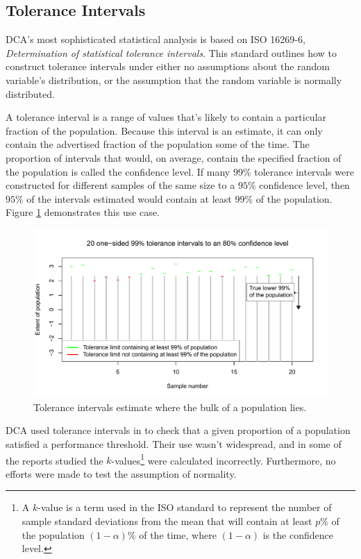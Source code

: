 \documentclass[11pt,a4paper,article]{memoir} %
\begin{document}
\subsection*{Tolerance Intervals}
DCA's most sophisticated statistical analysis is based on ISO 16269-6, \emph{Determination of statistical tolerance intervals}. This standard outlines how to construct tolerance intervals under either no assumptions about the random variable's distribution, or the assumption that the random variable is normally distributed.
\par
 A tolerance interval is a range of values that's likely to contain a particular fraction of the population. Because this interval is an estimate, it can only contain the advertised fraction of the population some of the time. The proportion of intervals that would, on average, contain the specified fraction of the population is called the confidence level. If many $99\%$ tolerance intervals were constructed for different samples of the same size to a $95\%$ confidence level, then $95\%$ of the intervals estimated would contain at least $99\%$ of the population. Figure \ref{fig:tolerance_intervals} demonstrates this use case.
\begin{figure}[h]
\includegraphics[width=\textwidth]{tolerance_intervals_2.pdf}
\caption{Tolerance intervals estimate where the bulk of a population lies.}
\label{fig:tolerance_intervals}
\end{figure}

DCA used tolerance intervals in to check that a given proportion of a population satisfied a performance threshold. Their use wasn't widespread, and in some of the reports studied the $k$-values\footnote{A $k$-value is a term used in the ISO standard to represent the number of sample standard deviations from the mean that will contain at least $p\%$ of the population $(1 - \alpha)\%$ of the time, where $(1 - \alpha)$ is the confidence level.} were calculated incorrectly. Furthermore, no efforts were made to test the assumption of normality.
\end{document}
